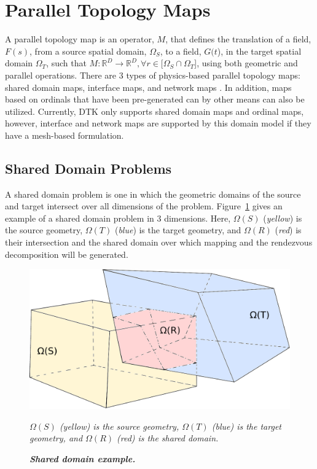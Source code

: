 \documentclass[letterpaper,12pt]{article}
\begin{document}
\section{Parallel Topology Maps}\label{sec:map}
A parallel topology map is an operator, $M$, that defines the
translation of a field, $F(s)$, from a source spatial domain,
$\Omega_S$, to a field, $G(t$), in the target spatial domain
$\Omega_T$, such that $M: \mathbb{R}^D \rightarrow \mathbb{R}^D,
\forall r \in [\Omega_S \cap \Omega_T$], using both geometric and
parallel operations. There are 3 types of physics-based parallel
topology maps: shared domain maps, interface maps, and network maps
\cite{LIME_2011}. In addition, maps based on ordinals that have been
pre-generated can by other means can also be utilized. Currently, DTK
only supports shared domain maps and ordinal maps, however, interface
and network maps are supported by this domain model if they have a
mesh-based formulation.

\subsection{Shared Domain Problems}\label{subsec:shared_domain}
A shared domain problem is one in which the geometric domains of the
source and target intersect over all dimensions of the
problem. Figure~\ref{fig:shared_domain} gives an example of a shared
domain problem in 3 dimensions. Here, $\Omega(S)$ ({\sl yellow}) is
the source geometry, $\Omega(T)$ ({\sl blue}) is the target geometry,
and $\Omega(R)$ ({\sl red}) is their intersection and the shared
domain over which mapping and the rendezvous decomposition will be
generated.

\begin{figure}[htpb!]
  \centering \includegraphics[width=5in]{overlapping_domain.pdf}
  \caption{\bf \sl Shared domain example.} {\sl $\Omega(S)$ (yellow)
    is the source geometry, $\Omega(T)$ (blue) is the target geometry,
    and $\Omega(R)$ (red) is the shared domain.}
  \label{fig:shared_domain}
\end{figure}
\end{document}

